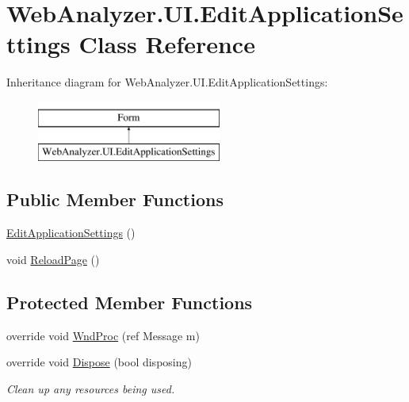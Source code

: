 \hypertarget{class_web_analyzer_1_1_u_i_1_1_edit_application_settings}{}\section{Web\+Analyzer.\+U\+I.\+Edit\+Application\+Settings Class Reference}
\label{class_web_analyzer_1_1_u_i_1_1_edit_application_settings}
Inheritance diagram for Web\+Analyzer.\+U\+I.\+Edit\+Application\+Settings\+:\begin{figure}[H]
\begin{center}
\leavevmode
\includegraphics[height=2.000000cm]{class_web_analyzer_1_1_u_i_1_1_edit_application_settings}
\end{center}
\end{figure}
\subsection*{Public Member Functions}
\begin{DoxyCompactItemize}
\item 
\hyperlink{class_web_analyzer_1_1_u_i_1_1_edit_application_settings_a4ca4b7a4a61a5145fadec673040b99d2}{Edit\+Application\+Settings} ()
\item 
void \hyperlink{class_web_analyzer_1_1_u_i_1_1_edit_application_settings_a5155f1a4642ae5950d786bc76b4bc857}{Reload\+Page} ()
\end{DoxyCompactItemize}
\subsection*{Protected Member Functions}
\begin{DoxyCompactItemize}
\item 
override void \hyperlink{class_web_analyzer_1_1_u_i_1_1_edit_application_settings_a1a386f773bda5cbc4f36637955857912}{Wnd\+Proc} (ref Message m)
\item 
override void \hyperlink{class_web_analyzer_1_1_u_i_1_1_edit_application_settings_af10f412e0fc3ff84a583a96097196781}{Dispose} (bool disposing)
\begin{DoxyCompactList}\small\item\em Clean up any resources being used. \end{DoxyCompactList}\end{DoxyCompactItemize}
